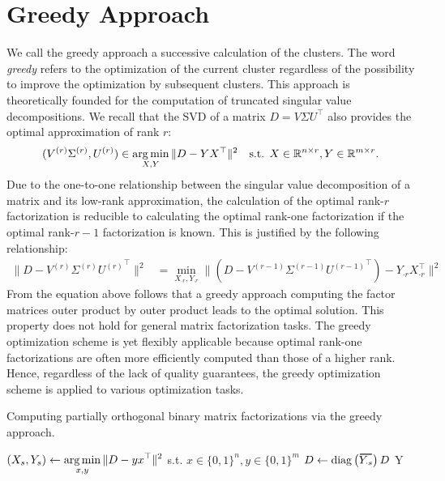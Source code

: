 \section{Greedy Approach}\label{sec:ZS:GreedyApproach}
We call the greedy approach a successive calculation of the clusters. The word \emph{greedy} refers to the optimization of the current cluster regardless of the possibility to improve the optimization by subsequent clusters. This approach is theoretically founded for the computation of truncated singular value decompositions. 
We recall that the SVD of a matrix $D=V\Sigma U^\top$ also provides the optimal approximation of rank $r$:
\begin{align*}
     (V^{(r)}\Sigma^{(r)},U^{(r)})&\in\operatorname*{arg\,min}_{X,Y}\|D-YX^\top\|^2 &\text{s.t. } X\in\mathbb{R}^{n\times r}, Y\in\mathbb{R}^{m\times r}.
\end{align*}
Due to the one-to-one relationship between the singular value decomposition of a matrix and its low-rank approximation, the calculation of the optimal rank-$r$ factorization is reducible to calculating the optimal rank-one factorization if the optimal rank-$r-1$ factorization is known. This is justified by the following relationship:  
\begin{align*}
\|D-V^{(r)}\Sigma^{(r)}{U^{(r)}}^\top\|^2
     &= \min_{X_{\cdot r},Y_{\cdot r}} \|(D-V^{(r-1)}\Sigma^{(r-1)}{U^{(r-1)}}^\top)-Y_{\cdot r}X_{\cdot r}^\top\|^2
\end{align*}
From the equation above follows that a greedy approach computing the factor matrices outer product by outer product leads to the optimal solution. This property does not hold for general matrix factorization tasks. The greedy optimization scheme is yet flexibly applicable because optimal rank-one factorizations are often more efficiently computed than those of a higher rank. Hence, regardless of the lack  of quality guarantees, the greedy optimization scheme is applied to various optimization tasks.
\begin{algorithm}[t]
\caption{Computing partially orthogonal binary matrix factorizations via the greedy approach.} 
\begin{algorithmic}[1]
    	\State $\displaystyle(X_s,Y_s)\gets \operatorname*{arg\,min}_{x,y} \|D-yx^\top\|^2 $ \hfill s.t. $x\in\{0,1\}^n,y\in\{0,1\}^m$
    	\label{alg:greedy:opt}
    	\State $D\gets \diag\left(\thickbar{Y_{\cdot s}}\right)D$ \label{alg:greedy:reduce}
    \EndFor
    \State \Return Y
  \EndFunction
\end{algorithmic}
\label{alg:greedy}
\end{algorithm}

